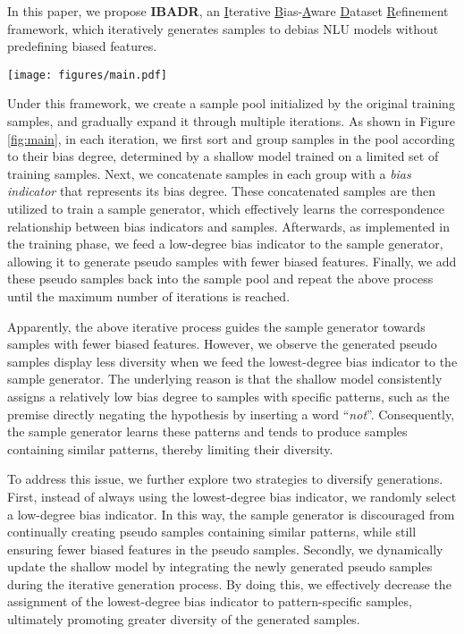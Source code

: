 \documentclass[11pt]{article}
\def\model{\textsc{IBADR}\xspace}
\begin{document}
In this paper, we propose \textbf{\model}, an \underline{I}terative \underline{B}ias-\underline{A}ware \underline{D}ataset \underline{R}efinement framework, which iteratively generates samples to debias NLU models without predefining biased features. 
\begin{figure*}[!t]
    \centering
    \texttt{[image: figures/main.pdf]}
    \caption{Overview of the iterative sample generation process, which consists of four key stages:  Setting bias indicator;  Finetuning sample generator;  Generating pseudo samples; and  Expanding sample pool. %
    Through $N_{iter}$ iterations of the above steps, we continuously augmented the sample pool with pseudo samples, which can be effectively employed to debias the NLU models.}
    \label{fig:main}
\end{figure*}
Under this framework, we create a sample pool initialized by the original training samples, and gradually expand it through multiple iterations. 
As shown in Figure \ref{fig:main},
in each iteration, we first sort and group samples in the pool according to their bias degree, determined by a shallow model trained on a limited set of training samples. Next, we concatenate samples in each group with a \emph{bias indicator} that represents its bias degree. These concatenated samples are then utilized to train a sample generator, which effectively learns the correspondence relationship between bias indicators and samples. Afterwards, as implemented in the training phase, we feed a low-degree bias indicator to the sample generator, allowing it to generate pseudo samples with fewer biased features. Finally, we add these pseudo samples back into the sample pool and repeat the above process until the maximum number of iterations is reached. 

Apparently, the above iterative process guides the sample generator towards samples with fewer biased features. However, we observe the generated pseudo samples display less diversity when we feed the lowest-degree bias indicator to the sample generator. The underlying reason is that the shallow model consistently assigns a relatively low bias degree to samples with specific patterns, such as the premise directly negating the hypothesis by inserting a word ``\textit{not}''. Consequently, the sample generator learns these patterns and tends to produce samples containing similar patterns, thereby limiting their diversity.

To address this issue, we further explore two strategies to diversify generations. 
First, instead of always using the lowest-degree bias indicator, we randomly select a low-degree bias indicator.
In this way, the sample generator is discouraged from continually creating pseudo samples containing similar patterns,
while still ensuring fewer biased features in the pseudo samples. 
Secondly, we dynamically update the shallow model by integrating the newly generated pseudo samples during the iterative generation process. By doing this, we effectively decrease the assignment of the lowest-degree bias indicator to pattern-specific samples, ultimately promoting greater diversity of the generated samples.
\end{document}
